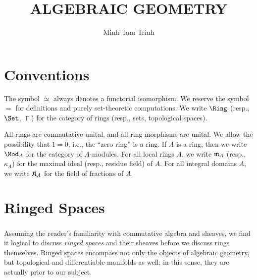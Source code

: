 \documentclass[10pt,final,oneside]{amsbook}
\numberwithin{equation}{section}
\begin{document}
\frontmatter


\title{\MakeUppercase{Algebraic Geometry}}


\author{Minh-Tam Trinh}

\maketitle
\tableofcontents


\mainmatter

\chapter*{Conventions}

The symbol $\simeq$ always denotes a functorial isomorphism.
We reserve the symbol $=$ for definitions and purely set-theoretic computations.
We write $\Ring$ (resp., $\Set$, $\Top$) for the category of rings (resp., sets, topological spaces).

All rings are commutative unital, and all ring morphisms are unital.
We allow the possibility that $1 = 0$, i.e., the ``zero ring'' is a ring.
If $A$ is a ring, then we write $\Mod_A$ for the category of $A$-modules.
For all local rings $A$, we write $\mathfrak{m}_A$ (resp., $\kappa_A$) for the maximal ideal (resp., residue field) of $A$.
For all integral domains $A$, we write $\frak{K}_A$ for the field of fractions of $A$.

\setcounter{chapter}{-1}
\chapter{Ringed Spaces}

\subsection{}

Assuming the reader's familiarity with commutative algebra and sheaves, we find it logical to discuss \emph{ringed spaces} and their sheaves before we discuss rings themselves.
Ringed spaces encompass not only the objects of algebraic geometry, but topological and differentiable manifolds as well; in this sense, they are actually prior to our subject.
\end{document}
